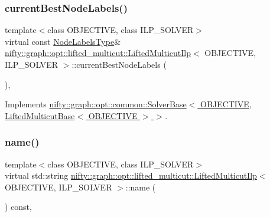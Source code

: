 \subsubsection{\texorpdfstring{current\+Best\+Node\+Labels()}{currentBestNodeLabels()}}
{\footnotesize\ttfamily template$<$class O\+B\+J\+E\+C\+T\+I\+VE, class I\+L\+P\+\_\+\+S\+O\+L\+V\+ER$>$ \\
virtual const \hyperlink{classnifty_1_1graph_1_1opt_1_1lifted__multicut_1_1LiftedMulticutIlp_a05df928d48fd5cd43241c999314aa92f}{Node\+Labels\+Type}\& \hyperlink{classnifty_1_1graph_1_1opt_1_1lifted__multicut_1_1LiftedMulticutIlp}{nifty\+::graph\+::opt\+::lifted\+\_\+multicut\+::\+Lifted\+Multicut\+Ilp}$<$ O\+B\+J\+E\+C\+T\+I\+VE, I\+L\+P\+\_\+\+S\+O\+L\+V\+ER $>$\+::current\+Best\+Node\+Labels (\begin{DoxyParamCaption}{ }\end{DoxyParamCaption})\hspace{0.3cm}{\ttfamily [inline]}, {\ttfamily [virtual]}}



Implements \hyperlink{classnifty_1_1graph_1_1opt_1_1common_1_1SolverBase_a7bbe01ee201cf3157b251e54c5ff0619}{nifty\+::graph\+::opt\+::common\+::\+Solver\+Base$<$ O\+B\+J\+E\+C\+T\+I\+V\+E, Lifted\+Multicut\+Base$<$ O\+B\+J\+E\+C\+T\+I\+V\+E $>$ $>$}.

\mbox{\label{classnifty_1_1graph_1_1opt_1_1lifted__multicut_1_1LiftedMulticutIlp_aea508a0c1233c7e391e9dfbb16fee43e}} 
\subsubsection{\texorpdfstring{name()}{name()}}
{\footnotesize\ttfamily template$<$class O\+B\+J\+E\+C\+T\+I\+VE, class I\+L\+P\+\_\+\+S\+O\+L\+V\+ER$>$ \\
virtual std\+::string \hyperlink{classnifty_1_1graph_1_1opt_1_1lifted__multicut_1_1LiftedMulticutIlp}{nifty\+::graph\+::opt\+::lifted\+\_\+multicut\+::\+Lifted\+Multicut\+Ilp}$<$ O\+B\+J\+E\+C\+T\+I\+VE, I\+L\+P\+\_\+\+S\+O\+L\+V\+ER $>$\+::name (\begin{DoxyParamCaption}{ }\end{DoxyParamCaption}) const\hspace{0.3cm}{\ttfamily [inline]}, {\ttfamily [virtual]}}



